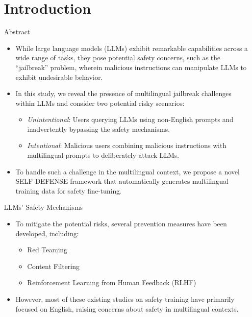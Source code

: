 \section{Introduction}

\begin{frame}{Abstract}
    \begin{itemize}
        \item While large language models (LLMs) exhibit remarkable capabilities across a wide range of tasks, they pose potential safety concerns, such as the “jailbreak” problem, wherein malicious instructions can manipulate LLMs to exhibit undesirable behavior.
        \item In this study, we reveal the presence of multilingual jailbreak challenges within LLMs and consider two potential risky scenarios: 
        \begin{itemize}
            \item \emph{Unintentional}: Users querying LLMs using non-English prompts and inadvertently bypassing the safety mechanisms.
            \item \emph{Intentional}: Malicious users combining malicious instructions with multilingual prompts to deliberately attack LLMs.
        \end{itemize}
        \item To handle such a challenge in the multilingual context, we propose a novel SELF-DEFENSE framework that automatically generates multilingual training data for safety fine-tuning.
    \end{itemize}
\end{frame}

\begin{frame}{LLMs’ Safety Mechanisms}
    \begin{itemize}
        \item To mitigate the potential risks, several prevention measures have been developed, including:
        \begin{itemize}
            \item Red Teaming
            \item Content Filtering
            \item Reinforcement Learning from Human Feedback (RLHF)
        \end{itemize}
        \item However, most of these existing studies on safety training have primarily focused on English, raising concerns about safety in multilingual contexts.
    \end{itemize}
\end{frame}

